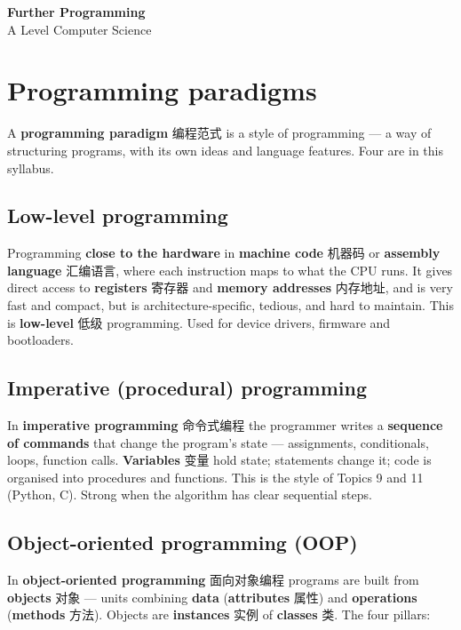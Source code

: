 \documentclass[11pt]{article}
\begin{document}
\begin{center}
  {\LARGE\bfseries Further Programming}\\[0.35em]
  {\large A Level Computer Science}
\end{center}
\vspace{0.6em}

\section*{Programming paradigms}

A \textbf{programming paradigm} 编程范式 is a style of programming — a way of structuring programs, with its own ideas and language features. Four are in this syllabus.

\subsection*{Low-level programming}

Programming \textbf{close to the hardware} in \textbf{machine code} 机器码 or \textbf{assembly language} 汇编语言, where each instruction maps to what the CPU runs. It gives direct access to \textbf{registers} 寄存器 and \textbf{memory addresses} 内存地址, and is very fast and compact, but is architecture-specific, tedious, and hard to maintain. This is \textbf{low-level} 低级 programming. Used for device drivers, firmware and bootloaders.

\subsection*{Imperative (procedural) programming}

In \textbf{imperative programming} 命令式编程 the programmer writes a \textbf{sequence of commands} that change the program's state — assignments, conditionals, loops, function calls. \textbf{Variables} 变量 hold state; statements change it; code is organised into procedures and functions. This is the style of Topics 9 and 11 (Python, C). Strong when the algorithm has clear sequential steps.

\subsection*{Object-oriented programming (OOP)}

In \textbf{object-oriented programming} 面向对象编程 programs are built from \textbf{objects} 对象 — units combining \textbf{data} (\textbf{attributes} 属性) and \textbf{operations} (\textbf{methods} 方法). Objects are \textbf{instances} 实例 of \textbf{classes} 类. The four pillars:
\end{document}
